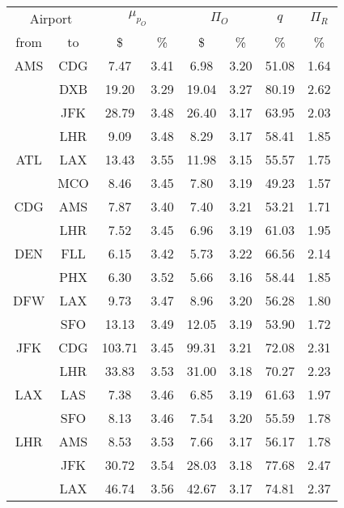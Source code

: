 \begin{table}
\begin{center}
\begin{tabular}{c c | c c | c c | c | c }
\toprule
\multicolumn{2}{c|}{Airport}  &  \multicolumn{2}{c|}{$\mu_{p_O}$} & \multicolumn{2}{c|}{$\Pi_O$}  &  $q$  & $\Pi_R$ \\[.4ex]
from  &  to  &  \$  & \%  &  \$  & \%  & \%  & \% \\
    \midrule
AMS  &  CDG  &    7.47  &  3.41  &    6.98  &  3.20  &  51.08  &  1.64 \\
~    &  DXB  &   19.20  &  3.29  &   19.04  &  3.27  &  80.19  &  2.62 \\
~    &  JFK  &   28.79  &  3.48  &   26.40  &  3.17  &  63.95  &  2.03 \\
~    &  LHR  &    9.09  &  3.48  &    8.29  &  3.17  &  58.41  &  1.85 \\[.5ex]
ATL  &  LAX  &   13.43  &  3.55  &   11.98  &  3.15  &  55.57  &  1.75 \\
~    &  MCO  &    8.46  &  3.45  &    7.80  &  3.19  &  49.23  &  1.57 \\[.5ex]
CDG  &  AMS  &    7.87  &  3.40  &    7.40  &  3.21  &  53.21  &  1.71 \\
~    &  LHR  &    7.52  &  3.45  &    6.96  &  3.19  &  61.03  &  1.95 \\[.5ex]
DEN  &  FLL  &    6.15  &  3.42  &    5.73  &  3.22  &  66.56  &  2.14 \\
~    &  PHX  &    6.30  &  3.52  &    5.66  &  3.16  &  58.44  &  1.85 \\[.5ex]
DFW  &  LAX  &    9.73  &  3.47  &    8.96  &  3.20  &  56.28  &  1.80 \\
~    &  SFO  &   13.13  &  3.49  &   12.05  &  3.19  &  53.90  &  1.72 \\[.5ex]
JFK  &  CDG  &  103.71  &  3.45  &   99.31  &  3.21  &  72.08  &  2.31 \\
~    &  LHR  &   33.83  &  3.53  &   31.00  &  3.18  &  70.27  &  2.23 \\[.5ex]
LAX  &  LAS  &    7.38  &  3.46  &    6.85  &  3.19  &  61.63  &  1.97 \\
~    &  SFO  &    8.13  &  3.46  &    7.54  &  3.20  &  55.59  &  1.78 \\[.5ex]
LHR  &  AMS  &    8.53  &  3.53  &    7.66  &  3.17  &  56.17  &  1.78 \\
~    &  JFK  &   30.72  &  3.54  &   28.03  &  3.18  &  77.68  &  2.47 \\
~    &  LAX  &   46.74  &  3.56  &   42.67  &  3.17  &  74.81  &  2.37 \\

\end{tabular}
\end{center}
\end{table}
